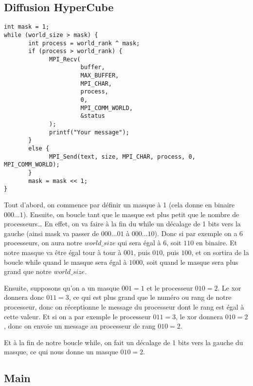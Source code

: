 \documentclass[11pt]{article}
\begin{document}
\subsection{Diffusion HyperCube}
\label{sec:org1e5f34e}
\begin{verbatim}
int mask = 1;
while (world_size > mask) {
       int process = world_rank ^ mask;
       if (process > world_rank) {
             MPI_Recv(
                      buffer,
                      MAX_BUFFER,
                      MPI_CHAR,
                      process,
                      0,
                      MPI_COMM_WORLD,
                      &status
             );
             printf("Your message");
       }
       else {
             MPI_Send(text, size, MPI_CHAR, process, 0, MPI_COMM_WORLD);
       }
       mask = mask << 1;
}
\end{verbatim}
Tout d'abord, on commence par définir un masque à 1 (cela donne en binaire \(000 \dots 1\)).
Ensuite, on boucle tant que le masque est plus petit que le nombre de processeurs\ldots{}
En effet, on va faire à la fin du while un décalage de 1 bits vers la gauche (ainsi mask va passer de \(000\dots01\) à \(000\dots10\)).
Donc si par exemple on a 6 processeurs, on aura notre \(world\_size\) qui sera égal à 6, soit \(110\) en binaire.
Et notre masque va être égal tour à tour à \(001\), puis \(010\), puis \(100\), et on sortira de la boucle while quand le masque sera égal à \(1000\),
soit quand le masque sera plus grand que notre \(world\_size\).

Ensuite, supposons qu'on a un masque \(001 = 1\) et le processeur \(010 = 2\). Le xor donnera donc \(011 = 3\), ce qui est plus grand que le numéro ou rang de notre processeur, donc on réceptionne le message
du processeur dont le rang est égal à cette valeur. Et si on a par exemple le processeur \(011 = 3\), le xor donnera \(010 = 2\), donc on envoie un message au processeur de rang \(010 = 2\).

Et à la fin de notre boucle while, on fait un décalage de 1 bits vers la gauche du masque, ce qui nous donne un masque \(010 = 2\).

\subsection{Main}
\label{sec:org9167231}
\end{document}
